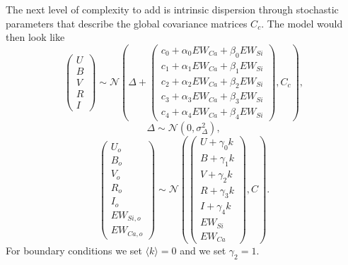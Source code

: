 \documentclass[11pt, oneside]{article}   	%
\begin{document}
The next level of complexity to add is intrinsic dispersion through stochastic parameters that describe the global  covariance matrices
$C_{c}$.  The model would then look like
\begin{equation*}
\left(
\begin{matrix}
U\\B\\V\\R\\I
\end{matrix}
\right) \sim \mathcal{N}
\left(
\Delta +
\left(
\begin{matrix}
c_0+\alpha_0 EW_{Ca} + \beta_0 EW_{Si} \\
c_1+\alpha_1 EW_{Ca} + \beta_1 EW_{Si}  \\
c_2+\alpha_2 EW_{Ca} + \beta_2 EW_{Si} \\
c_3+\alpha_3 EW_{Ca} + \beta_3 EW_{Si} \\
c_4+\alpha_4 EW_{Ca} + \beta_4 EW_{Si}
\end{matrix}
\right)
,C_{c}
\right),
\end{equation*}
\begin{equation*}
\Delta \sim \mathcal{N}(0,\sigma^2_\Delta),
\end{equation*}
\begin{equation*}
\left(
\begin{matrix}
U_o\\B_o\\ V_o\\R_o\\I_o\\EW_{Si, o}\\ EW_{Ca, o}
\end{matrix}
\right) \sim \mathcal{N}
\left(
\left(
\begin{matrix}
U +\gamma_0 k \\B +\gamma_1 k \\V+\gamma_2 k\\R+\gamma_3 k\\I+\gamma_4 k\\
EW_{Si}\\ EW_{Ca}
\end{matrix}
\right)
,C
\right).
\end{equation*}
For boundary conditions we set  $\langle k \rangle=0$ and we set $\gamma_2=1$.
%
%
\end{document}
